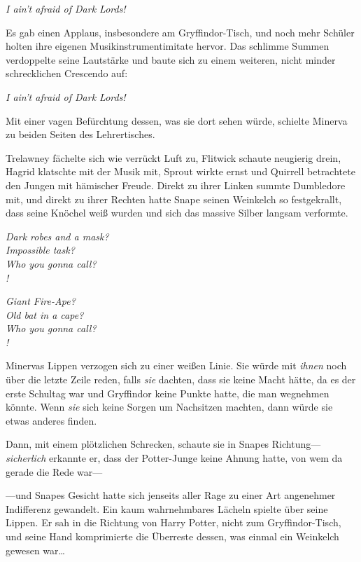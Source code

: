 \begin{center}
\emph{I ain’t afraid of Dark Lords!}
\end{center}

Es gab einen Applaus, insbesondere am Gryffindor-Tisch, und noch mehr Schüler holten ihre eigenen Musikinstrumentimitate hervor. Das schlimme Summen verdoppelte seine Lautstärke und baute sich zu einem weiteren, nicht minder schrecklichen Crescendo auf:

\begin{center}
\emph{I ain’t afraid of Dark Lords!}
\end{center}

Mit einer vagen Befürchtung dessen, was sie dort sehen würde, schielte Minerva zu beiden Seiten des Lehrertisches.

Trelawney fächelte sich wie verrückt Luft zu, Flitwick schaute neugierig drein, Hagrid klatschte mit der Musik mit, Sprout wirkte ernst und Quirrell betrachtete den Jungen mit hämischer Freude. Direkt zu ihrer Linken summte Dumbledore mit, und direkt zu ihrer Rechten hatte Snape seinen Weinkelch so festgekrallt, dass seine Knöchel weiß wurden und sich das massive Silber langsam verformte.

\begin{center}
\emph{Dark robes and a mask?\\
Impossible task?\\
Who you gonna call?\\
!}

\emph{Giant Fire-Ape?\\
Old bat in a cape?\\
Who you gonna call?\\
!}
\end{center}

Minervas Lippen verzogen sich zu einer weißen Linie. Sie würde mit \emph{ihnen} noch über die letzte Zeile reden, falls \emph{sie} dachten, dass sie keine Macht hätte, da es der erste Schultag war und Gryffindor keine Punkte hatte, die man wegnehmen könnte. Wenn \emph{sie} sich keine Sorgen um Nachsitzen machten, dann würde sie etwas anderes finden.

Dann, mit einem plötzlichen Schrecken, schaute sie in Snapes Richtung—\emph{sicherlich} erkannte er, dass der Potter-Junge keine Ahnung hatte, von wem da gerade die Rede war—

—und Snapes Gesicht hatte sich jenseits aller Rage zu einer Art angenehmer Indifferenz gewandelt. Ein kaum wahrnehmbares Lächeln spielte über seine Lippen. Er sah in die Richtung von Harry Potter, nicht zum Gryffindor-Tisch, und seine Hand komprimierte die Überreste dessen, was einmal ein Weinkelch gewesen war…

